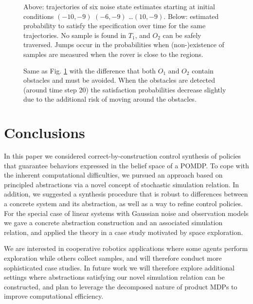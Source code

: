 \documentclass{ifacconf}
\begin{document}
\begin{figure}
  \footnotesize
  \setlength\figurewidth{\columnwidth}
  \setlength{}

  
  \setlength{}

  
  \caption{Above: trajectories of six noise state estimates starting at initial conditions $(-10, -9)$ $(-6, -9)$ \ldots $(10,-9)$. Below: estimated probability to satisfy the specification over time for the same trajectories. No sample is found in $T_1$, and $O_2$ can be safely traversed. Jumps occur in the probabilities when (non-)existence of samples are measured when the rover is close to the regions.}
  \label{fig:exp1}
\end{figure}

\begin{figure}
  \footnotesize
  \setlength\figurewidth{\columnwidth}
  \setlength{}

  

  \setlength{}

  
  \caption{Same as Fig. \ref{fig:exp1} with the difference that both $O_1$ and $O_2$ contain obstacles and must be avoided. When the obstacles are detected (around time step 20) the satisfaction probabilities decrease slightly due to the additional risk of moving around the obstacles.}
  \label{fig:exp2}
\end{figure}


\section{Conclusions}
\label{sec:conclusions}

In this paper we considered correct-by-construction control synthesis of policies that guarantee behaviors expressed in the belief space of a POMDP. To cope with the inherent computational difficulties, we pursued an approach based on principled abstractions via a novel concept of stochastic simulation relation. In addition, we suggested a synthesis procedure that is robust to differences between a concrete system and its abstraction, as well as a way to refine control policies. For the special case of linear systems with Gaussian noise and observation models we gave a concrete abstraction construction and an associated simulation relation, and applied the theory in a case study motivated by space exploration.

We are interested in cooperative robotics applications where some agents perform exploration while others collect samples, and will therefore conduct more sophisticated case studies. In future work we will therefore explore additional settings where abstractions satisfying our novel simulation relation can be constructed, and plan to leverage the decomposed nature of product MDPs to improve computational efficiency.


\end{document}
